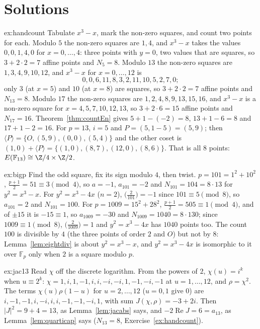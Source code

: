 \section{Solutions}

\begin{solution}{ex:handcount}
\idea Tabulate $x^3-x$, mark the non-zero squares, and count two points for each.
\writeup Modulo $5$ the non-zero squares are $1,4$, and $x^3-x$ takes the values $0,0,1,4,0$ for $x=0,\dots,4$: three points with $y=0$, two values that are
squares, so $3+2\cdot2=7$ affine points and $N_5=8$. Modulo $13$ the non-zero squares are $1,3,4,9,10,12$, and $x^3-x$ for $x=0,\dots,12$ is
\[
0,0,6,11,8,3,2,11,10,5,2,7,0;
\]
only $3$ (at $x=5$) and $10$ (at $x=8$) are squares, so $3+2\cdot2=7$ affine points and $N_{13}=8$. Modulo $17$ the non-zero squares are
$1,2,4,8,9,13,15,16$, and $x^3-x$ is a non-zero square for $x=4,5,7,10,12,13$, so $3+2\cdot6=15$ affine points and $N_{17}=16$. Theorem~\ref{thm:countEn}
gives $5+1-(-2)=8$, $13+1-6=8$ and $17+1-2=16$. For $p=13$, $i=5$ and $P=(5,1-5)=(5,9)$; then $\langle P\rangle=\{O,(5,9),(0,0),(5,4)\}$ and the other coset
is $(1,0)+\langle P\rangle=\{(1,0),(8,7),(12,0),(8,6)\}$. That is all $8$ points: $E(\mathbb F_{13})\cong\Z/4\times\Z/2$.
\end{solution}

\begin{solution}{ex:bigp}
\idea Find the odd square, fix its sign modulo $4$, then twist.
\writeup $p=101=1^2+10^2$, $\frac{p+1}2=51\equiv3\pmod4$, so $a=-1$, $a_{101}=-2$ and $N_{101}=104=8\cdot13$ for $y^2=x^3-x$. For $y^2=x^3-4x$ ($n=2$),
$\bigl(\frac2{101}\bigr)=-1$ since $101\equiv5\pmod8$, so $a_{101}=2$ and $N_{101}=100$. For $p=1009=15^2+28^2$, $\frac{p+1}2=505\equiv1\pmod4$, and of $\pm15$
it is $-15\equiv1$, so $a_{1009}=-30$ and $N_{1009}=1040=8\cdot130$; since $1009\equiv1\pmod8$, $\bigl(\frac2{1009}\bigr)=1$ and $y^2=x^3-4x$ has $1040$
points too. The count $100$ is divisible by $4$ (the three points of order $2$ and $O$) but not by $8$: Lemma~\ref{lem:eightdiv} is about $y^2=x^3-x$, and
$y^2=x^3-4x$ is isomorphic to it over $\mathbb F_p$ only when $2$ is a square modulo $p$.
\end{solution}

\begin{solution}{ex:jac13}
\idea Read $\chi$ off the discrete logarithm.
\writeup From the powers of $2$, $\chi(u)=i^k$ when $u\equiv2^k$: $\chi=1,i,1,-1,i,i,-i,-i,1,-1,-i,-1$ at $u=1,\dots,12$, and $\rho=\chi^2$. The terms
$\chi(u)\rho(1-u)$ for $u=2,\dots,12$ ($u=0,1$ give $0$) are $i,-1,-1,i,-i,i,i,-1,-1,-i,1$, with sum $J(\chi,\rho)=-3+2i$. Then $|J|^2=9+4=13$, as
Lemma~\ref{lem:jacabs} says, and $-2\operatorname{Re}J=6=a_{13}$, as Lemma~\ref{lem:quarticap} says ($N_{13}=8$, Exercise~\ref{ex:handcount}).
\end{solution}

